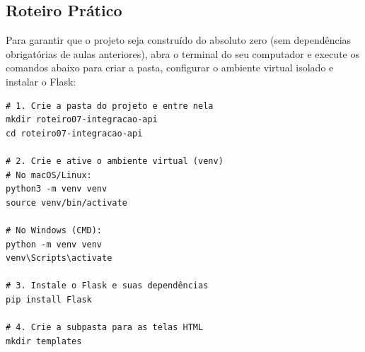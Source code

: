 \documentclass[12pt,a4paper]{article}
\begin{document}
\newpage

\subsection*{Roteiro Prático}

\begin{boxAtividade}
\begin{center}
\end{center}

\vspace{0.2cm}

Para garantir que o projeto seja construído do absoluto zero (sem dependências obrigatórias de aulas anteriores), abra o terminal do seu computador e execute os comandos abaixo para criar a pasta, configurar o ambiente virtual isolado e instalar o Flask:

\begin{boxCodigo}
\begin{verbatim}
# 1. Crie a pasta do projeto e entre nela
mkdir roteiro07-integracao-api
cd roteiro07-integracao-api

# 2. Crie e ative o ambiente virtual (venv)
# No macOS/Linux:
python3 -m venv venv
source venv/bin/activate

# No Windows (CMD):
python -m venv venv
venv\Scripts\activate

# 3. Instale o Flask e suas dependências
pip install Flask

# 4. Crie a subpasta para as telas HTML
mkdir templates
\end{verbatim}
\end{boxCodigo}
\end{boxAtividade}
\end{document}
